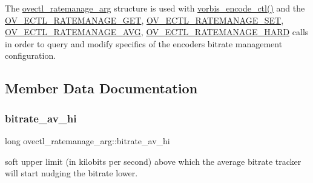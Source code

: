 The \hyperlink{structovectl__ratemanage__arg}{ovectl\+\_\+ratemanage\+\_\+arg} structure is used with \hyperlink{cocos2d_2external_2win10-specific_2OggDecoder_2include_2vorbis_2vorbisenc_8h_a5f398a378e20b8ce5e3341a582e773bd}{vorbis\+\_\+encode\+\_\+ctl()} and the \hyperlink{_2cocos2d_2external_2win32-specific_2OggDecoder_2include_2vorbis_2vorbisenc_8h_a614481c0d84bdfbb80eed9208b68f779}{O\+V\+\_\+\+E\+C\+T\+L\+\_\+\+R\+A\+T\+E\+M\+A\+N\+A\+G\+E\+\_\+\+G\+ET}, \hyperlink{_2cocos2d_2external_2win32-specific_2OggDecoder_2include_2vorbis_2vorbisenc_8h_a1daa1fd8ce1064cce01dde3ad447d389}{O\+V\+\_\+\+E\+C\+T\+L\+\_\+\+R\+A\+T\+E\+M\+A\+N\+A\+G\+E\+\_\+\+S\+ET}, \hyperlink{_2cocos2d_2external_2win32-specific_2OggDecoder_2include_2vorbis_2vorbisenc_8h_a34c3170d227b6368041e59c1dc7ed6e4}{O\+V\+\_\+\+E\+C\+T\+L\+\_\+\+R\+A\+T\+E\+M\+A\+N\+A\+G\+E\+\_\+\+A\+VG}, \hyperlink{_2cocos2d_2external_2win32-specific_2OggDecoder_2include_2vorbis_2vorbisenc_8h_af8869980a805f431af57a50dffbf5d33}{O\+V\+\_\+\+E\+C\+T\+L\+\_\+\+R\+A\+T\+E\+M\+A\+N\+A\+G\+E\+\_\+\+H\+A\+RD} calls in order to query and modify specifics of the encoder\textquotesingle{}s bitrate management configuration. 

\subsection{Member Data Documentation}
\mbox{\label{structovectl__ratemanage__arg_ac1e81b5a2e705022ca895f494718ded7}} 
\subsubsection{\texorpdfstring{bitrate\+\_\+av\+\_\+hi}{bitrate\_av\_hi}}
{\footnotesize\ttfamily long ovectl\+\_\+ratemanage\+\_\+arg\+::bitrate\+\_\+av\+\_\+hi}

soft upper limit (in kilobits per second) above which the average bitrate tracker will start nudging the bitrate lower. \mbox{\label{structovectl__ratemanage__arg_ac241670a3a608f114acaf8f26fe4e913}} 
